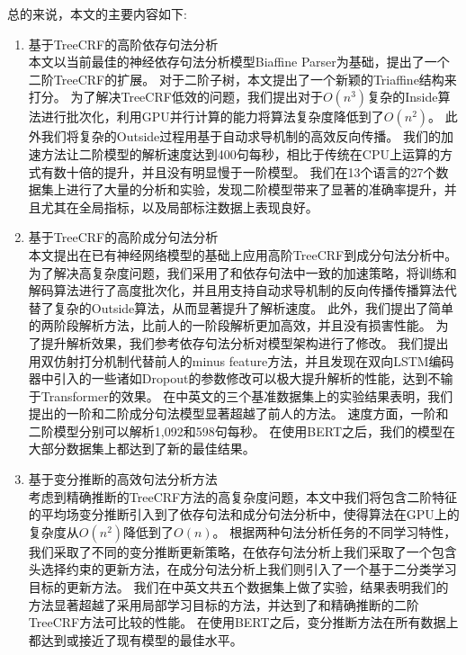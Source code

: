 总的来说，本文的主要内容如下:
\begin{enumerate}
	\item 基于TreeCRF的高阶依存句法分析\\
	      \indent 本文以当前最佳的神经依存句法分析模型Biaffine Parser为基础，提出了一个二阶TreeCRF的扩展。
	      对于二阶子树，本文提出了一个新颖的Triaffine结构来打分。
	      为了解决TreeCRF低效的问题，我们提出对于$O(n^3)$复杂的Inside算法进行批次化，利用GPU并行计算的能力将算法复杂度降低到了$O(n^2)$。
	      此外我们将复杂的Outside过程用基于自动求导机制的高效反向传播。
	      我们的加速方法让二阶模型的解析速度达到400句每秒，相比于传统在CPU上运算的方式有数十倍的提升，并且没有明显慢于一阶模型。
	      我们在13个语言的27个数据集上进行了大量的分析和实验，发现二阶模型带来了显著的准确率提升，并且尤其在全局指标，以及局部标注数据上表现良好。
	\item 基于TreeCRF的高阶成分句法分析\\
	      \indent 本文提出在已有神经网络模型的基础上应用高阶TreeCRF到成分句法分析中。
	      为了解决高复杂度问题，我们采用了和依存句法中一致的加速策略，将训练和解码算法进行了高度批次化，并且用支持自动求导机制的反向传播传播算法代替了复杂的Outside算法，从而显著提升了解析速度。
	      此外，我们提出了简单的两阶段解析方法，比前人的一阶段解析更加高效，并且没有损害性能。
	      为了提升解析效果，我们参考依存句法分析对模型架构进行了修改。
	      我们提出用双仿射打分机制代替前人的minus feature方法，并且发现在双向LSTM编码器中引入的一些诸如Dropout的参数修改可以极大提升解析的性能，达到不输于Transformer的效果。
	      在中英文的三个基准数据集上的实验结果表明，我们提出的一阶和二阶成分句法模型显著超越了前人的方法。
	      速度方面，一阶和二阶模型分别可以解析1,092和598句每秒。
	      在使用BERT之后，我们的模型在大部分数据集上都达到了新的最佳结果。
	\item 基于变分推断的高效句法分析方法\\
	      \indent 考虑到精确推断的TreeCRF方法的高复杂度问题，本文中我们将包含二阶特征的平均场变分推断引入到了依存句法和成分句法分析中，使得算法在GPU上的复杂度从$O(n^2)$降低到了$O(n)$。
	      根据两种句法分析任务的不同学习特性，我们采取了不同的变分推断更新策略，在依存句法分析上我们采取了一个包含头选择约束的更新方法，在成分句法分析上我们则引入了一个基于二分类学习目标的更新方法。
	      我们在中英文共五个数据集上做了实验，结果表明我们的方法显著超越了采用局部学习目标的方法，并达到了和精确推断的二阶TreeCRF方法可比较的性能。
	      在使用BERT之后，变分推断方法在所有数据上都达到或接近了现有模型的最佳水平。
\end{enumerate}

